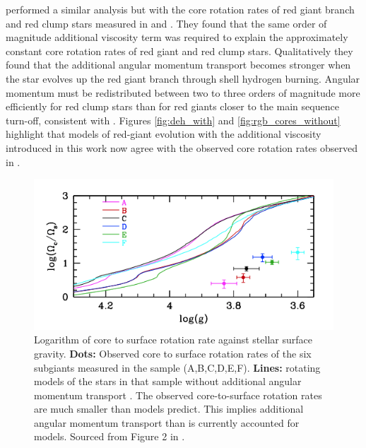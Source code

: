 \citet{moyano_asteroseismology_2022} performed a similar analysis but with the core rotation rates of red giant branch and red clump stars measured in \citet{mosser_spin_2012} and \citet{gehan_core_2018}.
They found that the same order of magnitude additional viscosity term was required to explain the approximately constant core rotation rates of red giant and red clump stars.  
Qualitatively they found that the additional angular momentum transport becomes stronger when the star evolves up the red giant branch through shell hydrogen burning.
Angular momentum must be redistributed between two to three orders of
magnitude more efficiently for red clump stars than for red giants closer to the main sequence turn-off, consistent with \citet{den_hartogh_constraining_2019}.
Figures \ref{fig:deh_with} and \ref{fig:rgb_cores_without}  highlight that models of red-giant evolution with the additional viscosity introduced in this work now agree with the observed core rotation rates observed in \citet{gehan_core_2018}.

\begin{figure}[h]
    \includegraphics[width=\textwidth]{Figures/intro_figures/deheuvels_disparity_without.png}
    \caption[A comparison of modelled and observed core to surface rotation rate ratios of post-main sequence stars without additional angular momentum transport.]{Logarithm of core to surface rotation rate against stellar surface gravity. 
    \textbf{Dots:} Observed core to surface rotation rates of the six subgiants measured in the \citet{deheuvels_seismic_2014} sample (A,B,C,D,E,F).
    \textbf{Lines:} rotating models of the stars in that sample without additional angular momentum transport \citep{eggenberger_asteroseismology_2019}.
    The observed core-to-surface rotation rates are much smaller than models predict. This implies additional angular momentum transport than is currently accounted for models.
    Sourced from Figure 2 in \citep{eggenberger_asteroseismology_2019}.}
    \label{fig:deh_without}
\end{figure}

